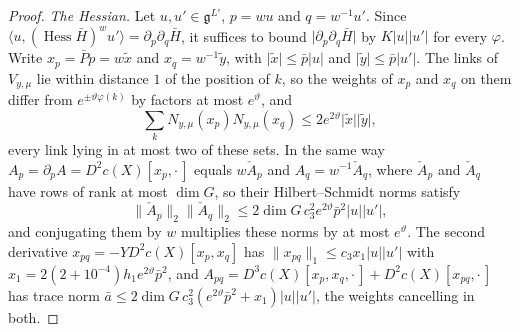 \documentclass[11pt]{amsart}
\theoremstyle{definition}
\theoremstyle{remark}
\numberwithin{equation}{section}
\newcommand{\g}{\mathfrak{g}}
\begin{document}
\begin{proof}
\emph{The Hessian.} Let $u,u'\in\g^{L'}$, $p=wu$ and $q=w^{-1}u'$. Since
$\langle u,(\operatorname{Hess}\bar H)^wu'\rangle=\partial_p\partial_q\bar
H$, it suffices to bound $\lvert\partial_p\partial_q\bar H\rvert$ by $K\lvert
u\rvert\lvert u'\rvert$ for every $\varphi$. Write $x_p=\bar Pp=w\tilde x$ and
$x_q=w^{-1}\tilde y$, with $\lvert\tilde x\rvert\le\bar p\lvert u\rvert$ and
$\lvert\tilde y\rvert\le\bar p\lvert u'\rvert$. The links of $V_{y,\mu}$ lie
within distance $1$ of the position of $k$, so the weights of $x_p$ and $x_q$
on them differ from $e^{\pm\vartheta\varphi(k)}$ by factors at most
$e^\vartheta$, and
\[
\sum_kN_{y,\mu}(x_p)N_{y,\mu}(x_q)\le2e^{2\vartheta}\lvert\tilde x\rvert
\lvert\tilde y\rvert,
\]
every link lying in at most two of these sets. In the same way $A_p=\partial
_pA=D^2c(X)[x_p,\cdot\,]$ equals $w\check A_p$ and $A_q=w^{-1}\check A_q$,
where $\check A_p$ and $\check A_q$ have rows of rank at most $\dim G$, so
their Hilbert--Schmidt norms satisfy
\[
\lVert\check A_p\rVert_2\lVert\check A_q\rVert_2\le2\dim G\,c_3^2e^{2
\vartheta}\bar p^2\lvert u\rvert\lvert u'\rvert,
\]
and conjugating them by $w$ multiplies these norms by at most $e^\vartheta$.
The second derivative $x_{pq}=-YD^2c(X)[x_p,x_q]$ has $\lVert x_{pq}\rVert_1
\le c_3x_1\lvert u\rvert\lvert u'\rvert$ with $x_1=2(2+10^{-4})h_1e^{2
\vartheta}\bar p^2$, and $A_{pq}=D^3c(X)[x_p,x_q,\cdot\,]+D^2c(X)[x_{pq},
\cdot\,]$ has trace norm $\bar a\le2\dim G\,c_3^2(e^{2\vartheta}\bar p^2+x_1)
\lvert u\rvert\lvert u'\rvert$, the weights cancelling in both.


\end{proof}
\end{document}
